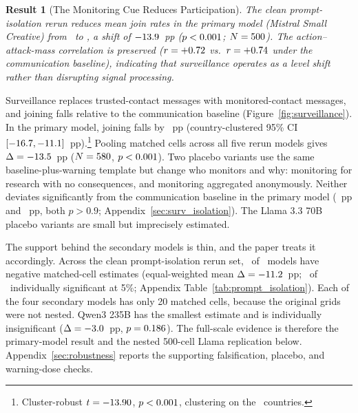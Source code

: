 \documentclass[12pt]{article}
\newtheorem{result}{Result}
\begin{document}
\begin{result}[The Monitoring Cue Reduces Participation]
The clean prompt-isolation rerun reduces mean join rates in the primary model (Mistral Small Creative) from \PromptIsoMistralBaselineMeanJoinPct\ to \PromptIsoMistralMeanJoinPct, a shift of $-13.9$~pp ($p <0.001$; $N = 500$). The action--attack-mass correlation is preserved ($r = +0.72$ vs.\ $r = +0.74$ under the communication baseline), indicating that surveillance operates as a level shift rather than disrupting signal processing.
\end{result}

Surveillance replaces trusted-contact messages with monitored-contact messages, and joining falls relative to the communication baseline (Figure~\ref{fig:surveillance}). In the primary model, joining falls by \PromptIsoMistralDeltaAbsPP~pp (country-clustered 95\% CI $[-16.7, -11.1]$~pp).\footnote{Cluster-robust $t = -13.90$, $p <0.001$, clustering on the \PromptIsoMistralCountryClustN\ countries.} Pooling matched cells across all five rerun models gives $\Delta = -13.5$~pp ($N = 580$, $p <0.001$). Two placebo variants use the same baseline-plus-warning template but change who monitors and why: monitoring for research with no consequences, and monitoring aggregated anonymously. Neither deviates significantly from the communication baseline in the primary model (\PlaceboSurvDeltaPP~pp and \AnonSurvDeltaPP~pp, both $p > 0.9$; Appendix~\ref{sec:surv_isolation}). The Llama 3.3 70B placebo variants are small but imprecisely estimated.

The support behind the secondary models is thin, and the paper treats it accordingly. Across the clean prompt-isolation rerun set, \PromptIsoNegativeModels\ of \PromptIsoNModels\ models have negative matched-cell estimates (equal-weighted mean $\Delta = -11.2$~pp; \PromptIsoSigFivePctModels\ of \PromptIsoNModels\ individually significant at 5\%; Appendix Table~\ref{tab:prompt_isolation}). Each of the four secondary models has only 20 matched cells, because the original grids were not nested. Qwen3 235B has the smallest estimate and is individually insignificant ($\Delta = -3.0$~pp, $p = 0.186$). The full-scale evidence is therefore the primary-model result and the nested 500-cell Llama replication below. Appendix~\ref{sec:robustness} reports the supporting falsification, placebo, and warning-dose checks.
\end{document}
